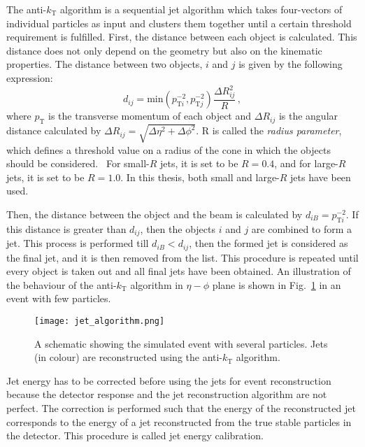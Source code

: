 The anti-$k_{\text{T}}$ algorithm is a sequential jet algorithm which takes four-vectors of individual particles as input and clusters them together until a certain threshold requirement is fulfilled. First, the distance between each object is calculated. This distance does not only depend on the geometry but also on the kinematic properties. The distance between two objects, $i$ and $j$ is given by the following expression:
\begin{equation}
	d_{ij} = \text{min}(p_{\text{T}i}^{-2} , p_{\text{T}j}^{-2})\frac{\Delta R_{ij}^{2}}{R} \,,
\end{equation}
where $p_{\text{T}}$ is the transverse momentum of each object and $\Delta R_{ij}$ is the angular distance calculated by $\Delta R_{ij} = \sqrt{\Delta \eta^{2}+\Delta\phi^{2}}$. R is called the \textit{radius parameter}, which defines a threshold value on a radius of the cone in which the objects should be considered.~\cite{thesis:tanja} For small-$R$ jets, it is set to be $R=0.4$, and for large-$R$ jets, it is set to be $R=1.0$. In this thesis, both small and large-$R$ jets have been used.

Then, the distance between the object and the beam is calculated by $d_{iB} = p_{\text{T}i}^{-2}$. If this distance is greater than $d_{ij}$, then the objects $i$ and $j$ are combined to form a jet. This process is performed till $d_{iB}<d_{ij}$, then the formed jet is considered as the final jet, and it is then removed from the list. This procedure is repeated until every object is taken out and all final jets have been obtained. An illustration of the behaviour of the anti-$k_{\text{T}}$ algorithm in $\eta-\phi$ plane is shown in Fig.\ \ref{fig:jetsandtaggers:jets:algorithm} in an event with few particles.~\cite{thesis:tanja}

\begin{figure}[hbt!]
	\centering
	\texttt{[image: jet\_algorithm.png]}
	\caption{A schematic showing the simulated event with several particles. Jets (in colour) are reconstructed using the anti-$k_{\text{T}}$ algorithm.~\cite{antikt}}
	\label{fig:jetsandtaggers:jets:algorithm}
\end{figure}

Jet energy has to be corrected before using the jets for event reconstruction because the detector response and the jet reconstruction algorithm are not perfect. The correction is performed such that the energy of the reconstructed jet corresponds to the energy of a jet reconstructed from the true stable particles in the detector. This procedure is called jet energy calibration.~\cite{jet_calibration}

